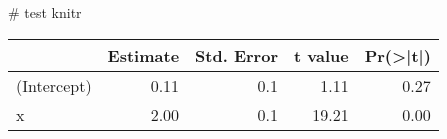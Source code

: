 
# test knitr

\begin{knitrout}
\color{fgcolor}\begin{kframe}
\begin{alltt}
   \hlkwb{<-} 
 \hlkwb{<-} 
 \hlkwb{<-} \hlopt{*} \hlopt{+} 
 \hlkwb{<-}  \hlopt{~} 
\hlstd{(}\hlopt{$} \hlstd{=}\hlstd{)}
\end{alltt}
\end{kframe}
\begin{tabular}{l|r|r|r|r}
\hline
  & Estimate & Std. Error & t value & Pr(>|t|)\\
\hline
(Intercept) & 0.11 & 0.1 & 1.11 & 0.27\\
\hline
x & 2.00 & 0.1 & 19.21 & 0.00\\
\hline
\end{tabular}


\end{knitrout}

